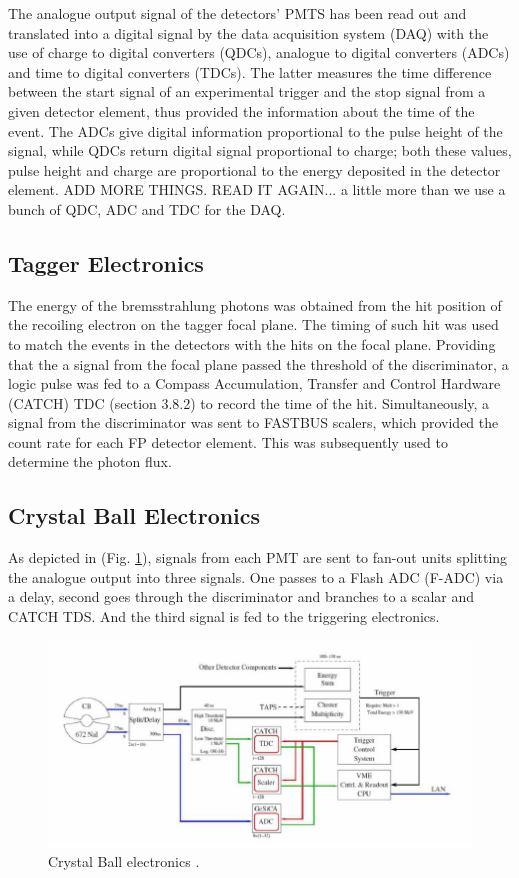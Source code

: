 \indent The analogue output signal of the detectors' PMTS has been read out and translated into a digital signal by the data acquisition system (DAQ) with the use of charge to digital converters (QDCs), analogue to digital converters (ADCs) and time to digital converters (TDCs). The latter measures the time difference between the start signal of an experimental trigger and the stop signal from a given detector element, thus provided the information about the time of the event. The ADCs give digital information proportional to the pulse height of the signal, while QDCs return digital signal proportional to charge; both these values, pulse height and charge are proportional to the energy deposited in the detector element.
ADD MORE THINGS. READ IT AGAIN... a little more than we use a bunch of QDC, ADC and TDC for the DAQ.

\subsection{Tagger Electronics}

\indent The energy of the bremsstrahlung photons was obtained from the hit position of the recoiling electron on the tagger focal plane. The timing of such hit was used to match the events in the detectors with the hits on the focal plane. Providing that the a signal from the focal plane passed the threshold of the discriminator, a logic pulse was fed to a Compass Accumulation, Transfer and Control Hardware (CATCH) TDC (section 3.8.2) to record the time of the hit. Simultaneously, a signal from the discriminator was sent to FASTBUS scalers, which provided the count rate for each FP detector element. This was subsequently used to determine the photon flux.

\subsection{Crystal Ball Electronics}

\indent As depicted in (Fig. \ref{cbelectronics}), signals from each PMT are sent to fan-out units splitting the analogue output into three signals. One passes to a Flash ADC (F-ADC) via a delay, second goes through the discriminator and branches to a scalar and CATCH TDS. And the third signal is fed to the triggering electronics.

\begin{figure}[H]
\begin{center}
\includegraphics[scale=1.0]{pictures/png/cbelectronics.png}
\caption{Crystal Ball electronics \cite{krambrich}.}
\label{cbelectronics}
\end{center}
\end{figure}

